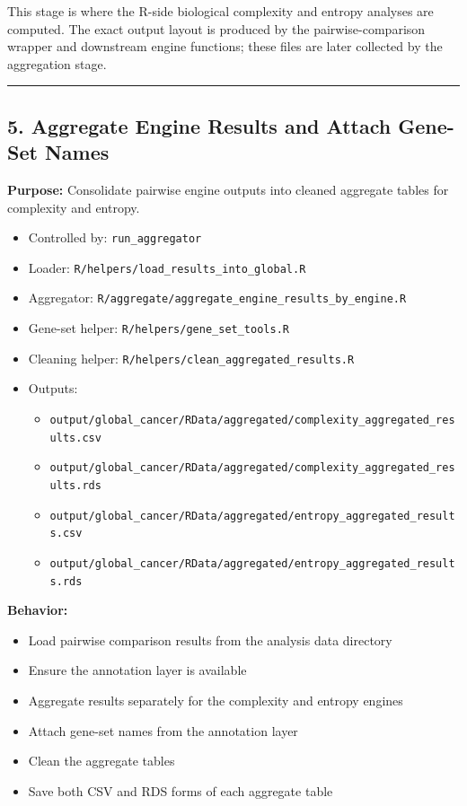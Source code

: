 \documentclass[
  letterpaper,
  DIV=11,
  numbers=noendperiod,
  openany,
  oneside]{scrreprt}
\providecommand{\tightlist}{%
  \setlength{\itemsep}{0pt}\setlength{\parskip}{0pt}}
\begin{document}
This stage is where the R-side biological complexity and entropy
analyses are computed. The exact output layout is produced by the
pairwise-comparison wrapper and downstream engine functions; these files
are later collected by the aggregation stage.

\begin{center}\rule{0.5\linewidth}{0.5pt}\end{center}

\subsection*{5. Aggregate Engine Results and Attach Gene-Set
Names}\label{aggregate-engine-results-and-attach-gene-set-names}

\textbf{Purpose:} Consolidate pairwise engine outputs into cleaned
aggregate tables for complexity and entropy.

\begin{itemize}
\tightlist
\item
  Controlled by: \texttt{run\_aggregator}
\item
  Loader: \texttt{R/helpers/load\_results\_into\_global.R}
\item
  Aggregator:
  \texttt{R/aggregate/aggregate\_engine\_results\_by\_engine.R}
\item
  Gene-set helper: \texttt{R/helpers/gene\_set\_tools.R}
\item
  Cleaning helper: \texttt{R/helpers/clean\_aggregated\_results.R}
\item
  Outputs:

  \begin{itemize}
  \tightlist
  \item
    \texttt{output/global\_cancer/RData/aggregated/complexity\_aggregated\_results.csv}
  \item
    \texttt{output/global\_cancer/RData/aggregated/complexity\_aggregated\_results.rds}
  \item
    \texttt{output/global\_cancer/RData/aggregated/entropy\_aggregated\_results.csv}
  \item
    \texttt{output/global\_cancer/RData/aggregated/entropy\_aggregated\_results.rds}
  \end{itemize}
\end{itemize}

\textbf{Behavior:}

\begin{itemize}
\tightlist
\item
  Load pairwise comparison results from the analysis data directory
\item
  Ensure the annotation layer is available
\item
  Aggregate results separately for the complexity and entropy engines
\item
  Attach gene-set names from the annotation layer
\item
  Clean the aggregate tables
\item
  Save both CSV and RDS forms of each aggregate table
\end{itemize}
\end{document}
